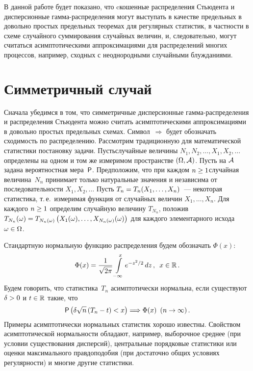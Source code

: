 \begin{multicols}{2}
В данной работе будет показано, что cкошенные распределения
Стьюдента и дисперсионные гам\-ма-рас\-пре\-де\-ле\-ния могут выступать в
качестве предельных в довольно простых предельных теоремах для
регулярных статистик, в частности в схеме случайного суммирования
случайных величин, и, следовательно, могут считаться
асимптотическими аппроксимациями для распределений многих
процессов, например, сходных с неоднородными случайными
блужданиями.

\section{Симметричный случай}

Сначала убедимся в том, что симметричные дисперсионные
гам\-ма-рас\-пре\-де\-ле\-ния и распределения Стьюдента можно считать
асимптотическими аппроксимациями в довольно простых предельных
схемах. Символ~$\Longrightarrow$ будет обозначать сходимость по
распределению. Рассмотрим традиционную для математической
статистики постановку задачи. Пусть\linebreak случайные величины
$N_1,N_2,\ldots ,X_1,X_2,\ldots$ определены на одном и том же
измеримом пространстве $(\Omega,{\cal A})$. Пусть на ${\cal A}$
задана вероятностная мера~${\sf P}$. Предположим, что при каждом
$n\hm\ge 1$\linebreak случайная величина~$N_n$ принимает только натуральные
значения и независима от последовательности $X_1,X_2,\ldots$ Пусть
$T_n\hm=T_n(X_1,\ldots ,X_n)$~--- некоторая статистика, т.\,е.\
измеримая функция от случайных величин $X_1,\ldots ,X_n$. Для
каждого $n\hm\ge1$ определим случайную величину $T_{N_n}$, положив
$T_{N_n}(\omega)\hm= T_{N_n(\omega)}\left(X_1(\omega),\ldots ,X_{N_n(\omega)}(\omega)\right)$
для каждого элементарного исхода $\omega\hm\in\Omega$.

Стандартную нормальную функцию распределения будем обозначать
$\Phi(x)$:
$$
\Phi(x)=\displaystyle\frac{\displaystyle 1\mathstrut}{\displaystyle \sqrt{2\pi}\mathstrut}\int\limits_{-\infty}^{x}e^{-z^2/2}\,dz\,,\enskip
 x\in\mathbb{R}\,.
$$
Будем говорить, что статистика~$T_n$ асимптотически нормальна, если
существуют $\delta\hm>0$ и $t\hm\in\r$ такие, что
\begin{equation}
{\sf
P}\left(\delta\sqrt{n}\left (T_n-t\right)<x\right)\Longrightarrow\Phi(x)
\enskip (n\to\infty)\,.\label{e5-kor}
\end{equation}
Примеры асимптотически нормальных статистик хорошо известны.
Свойством асимптотической нормальности обладают, например,
выборочное среднее (при условии существования дисперсий),
центральные порядковые статистики или оценки максимального
правдоподобия (при достаточно общих условиях регулярности) и
многие другие статистики.


\end{multicols}
